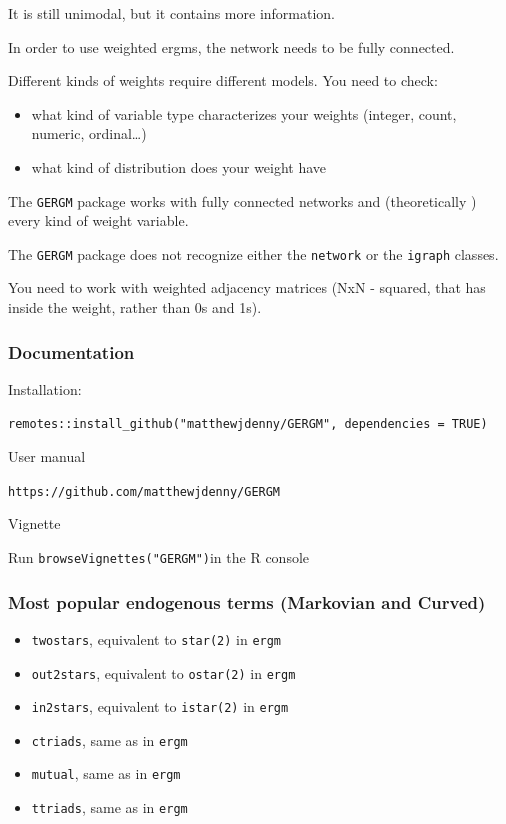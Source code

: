 \documentclass[
]{article}
\providecommand{\tightlist}{%
  \setlength{\itemsep}{0pt}\setlength{\parskip}{0pt}}
\begin{document}
It is still unimodal, but it contains more information.

In order to use weighted ergms, the network needs to be fully connected.

Different kinds of weights require different models. You need to check:

\begin{itemize}
\tightlist
\item
  what kind of variable type characterizes your weights (integer, count,
  numeric, ordinal\ldots)
\item
  what kind of distribution does your weight have
\end{itemize}

The \texttt{GERGM} package works with fully connected networks and
(theoretically ) every kind of weight variable.

The \texttt{GERGM} package does not recognize either the
\texttt{network} or the \texttt{igraph} classes.

You need to work with weighted adjacency matrices (NxN - squared, that
has inside the weight, rather than 0s and 1s).

\hypertarget{documentation}{%
\subsubsection{Documentation}\label{documentation}}

Installation:

\texttt{remotes::install\_github("matthewjdenny/GERGM",\ dependencies\ =\ TRUE)}

User manual

\texttt{https://github.com/matthewjdenny/GERGM}

Vignette

Run \texttt{browseVignettes("GERGM")}in the R console

\hypertarget{most-popular-endogenous-terms-markovian-and-curved}{%
\subsubsection{Most popular endogenous terms (Markovian and
Curved)}\label{most-popular-endogenous-terms-markovian-and-curved}}

\begin{itemize}
\item
  \texttt{twostars}, equivalent to \texttt{star(2)} in \texttt{ergm}
\item
  \texttt{out2stars}, equivalent to \texttt{ostar(2)} in \texttt{ergm}
\item
  \texttt{in2stars}, equivalent to \texttt{istar(2)} in \texttt{ergm}
\item
  \texttt{ctriads}, same as in \texttt{ergm}
\item
  \texttt{mutual}, same as in \texttt{ergm}
\item
  \texttt{ttriads}, same as in \texttt{ergm}
\end{itemize}
\end{document}
